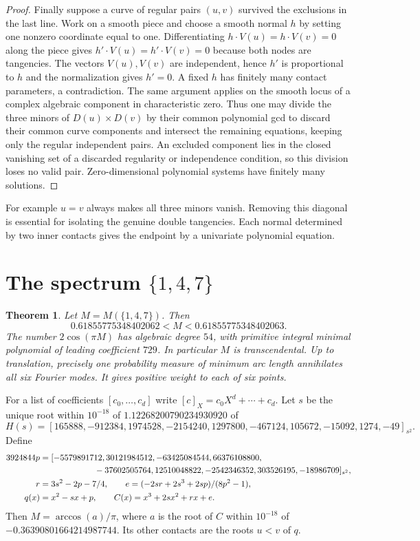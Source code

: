 \documentclass[10pt]{article}
\newtheorem{theorem}{Theorem}
\begin{document}
\begin{proof}
Finally suppose a curve of regular pairs $(u,v)$ survived the exclusions in the last line. Work on a smooth piece and choose a smooth normal $h$ by setting one nonzero coordinate equal to one. Differentiating $h\cdot V(u)=h\cdot V(v)=0$ along the piece gives $h'\cdot V(u)=h'\cdot V(v)=0$ because both nodes are tangencies. The vectors $V(u),V(v)$ are independent, hence $h'$ is proportional to $h$ and the normalization gives $h'=0$. A fixed $h$ has finitely many contact parameters, a contradiction. The same argument applies on the smooth locus of a complex algebraic component in characteristic zero. Thus one may divide the three minors of $D(u)\times D(v)$ by their common polynomial gcd to discard their common curve components and intersect the remaining equations, keeping only the regular independent pairs. An excluded component lies in the closed vanishing set of a discarded regularity or independence condition, so this division loses no valid pair. Zero-dimensional polynomial systems have finitely many solutions.
\end{proof}

For example $u=v$ always makes all three minors vanish. Removing this diagonal is essential for isolating the genuine double tangencies. Each normal determined by two inner contacts gives the endpoint by a univariate polynomial equation.

\section{The spectrum $\{1,4,7\}$}
\begin{theorem}\label{example}
Let $M=M(\{1,4,7\})$. Then
\[
 0.61855775348402062 < M < 0.61855775348402063 .
\]
The number $2\cos(\pi M)$ has algebraic degree $54$, with primitive integral minimal polynomial of leading coefficient $729$. In particular $M$ is transcendental. Up to translation, precisely one probability measure of minimum arc length annihilates all six Fourier modes. It gives positive weight to each of six points.
\end{theorem}

For a list of coefficients $[c_0,\ldots,c_d]$ write $[c]_X=c_0X^d+\cdots+c_d$. Let $s$ be the unique root within $10^{-18}$ of $1.12268200790234930920$ of
\[
 H(s)=[165888,-912384,1974528,-2154240,1297800,-467124,
                105672,-15092,1274,-49]_{s^2}.
\]
Define
\begin{align*}
 3924844p={}&[-5579891712,30121984512,-63425084544,66376108800,\\
     &\hspace{18mm}-37602505764,12510048822,-2542346352,303526195,-18986709]_{s^2},\\
 r={}&3s^2-2p-7/4,\qquad e=(-2sr+2s^3+2sp)/(8p^2-1),\\
 q(x)={}&x^2-sx+p,\qquad C(x)=x^3+2sx^2+rx+e.
\end{align*}
Then $M=\arccos(a)/\pi$, where $a$ is the root of $C$ within $10^{-18}$ of $-0.36390801664214987744$. Its other contacts are the roots $u<v$ of $q$.
\end{document}
